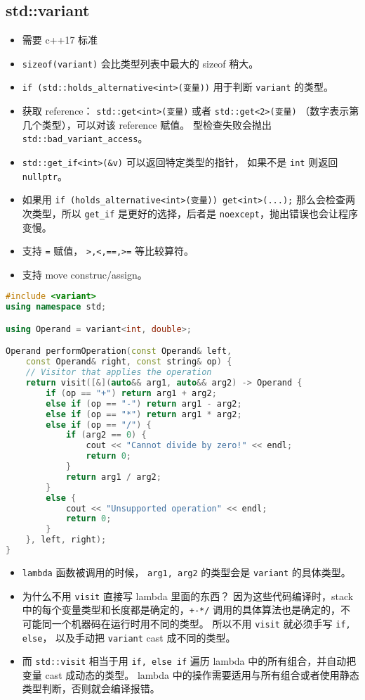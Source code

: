 \subsection{std::variant}
\begin{itemize}
\item 需要 c++17 标准
\item \verb|sizeof(variant)| 会比类型列表中最大的 sizeof 稍大。
\item \verb|if (std::holds_alternative<int>(变量))| 用于判断 \verb|variant| 的类型。
\item 获取 reference： \verb|std::get<int>(变量)| 或者 \verb|std::get<2>(变量)| （数字表示第几个类型），可以对该 reference 赋值。 型检查失败会抛出 \verb|std::bad_variant_access|。
\item \verb|std::get_if<int>(&v)| 可以返回特定类型的指针， 如果不是 \verb|int| 则返回 \verb|nullptr|。
\item 如果用 \verb|if (holds_alternative<int>(变量)) get<int>(...);| 那么会检查两次类型，所以 \verb|get_if| 是更好的选择，后者是 \verb|noexcept|，抛出错误也会让程序变慢。
\item 支持 \verb|=| 赋值， \verb|>,<,==,>=| 等比较算符。
\item 支持 move construc/assign。
\end{itemize}
\begin{lstlisting}[language=cpp]
#include <variant>
using namespace std;

using Operand = variant<int, double>;

Operand performOperation(const Operand& left,
    const Operand& right, const string& op) {
    // Visitor that applies the operation
    return visit([&](auto&& arg1, auto&& arg2) -> Operand {
        if (op == "+") return arg1 + arg2;
        else if (op == "-") return arg1 - arg2;
        else if (op == "*") return arg1 * arg2;
        else if (op == "/") {
            if (arg2 == 0) {
                cout << "Cannot divide by zero!" << endl;
                return 0;
            }
            return arg1 / arg2;
        }
        else {
            cout << "Unsupported operation" << endl;
            return 0;
        }
    }, left, right);
}
\end{lstlisting}
\begin{itemize}
\item \verb|lambda| 函数被调用的时候， \verb|arg1, arg2| 的类型会是 \verb|variant| 的具体类型。
\item 为什么不用 \verb`visit` 直接写 lambda 里面的东西？ 因为这些代码编译时，stack 中的每个变量类型和长度都是确定的，\verb|+-*/| 调用的具体算法也是确定的，不可能同一个机器码在运行时用不同的类型。 所以不用 \verb|visit| 就必须手写 \verb|if, else|， 以及手动把 \verb|variant| cast 成不同的类型。
\item 而 \verb|std::visit| 相当于用 \verb|if, else if| 遍历 lambda 中的所有组合，并自动把变量 cast 成动态的类型。 lambda 中的操作需要适用与所有组合或者使用静态类型判断，否则就会编译报错。
\end{itemize}

